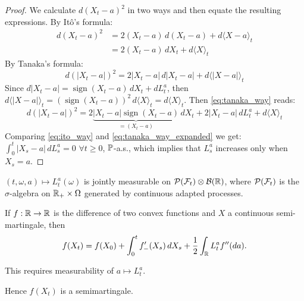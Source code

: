 \begin{proof}
    We calculate $d(X_t - a)^2$ in two ways and then equate the resulting expressions.
    By Itô's formula:
    \begin{align}
        d(X_t - a)^2 &= 2(X_t - a) \, d(X_t - a) + d\langle X - a \rangle_t \nonumber \\
        &= 2(X_t - a) \, dX_t + d\langle X \rangle_t \label{eq:ito_way}
    \end{align}
    By Tanaka's formula:
    \begin{equation}
        d(|X_t - a|)^2 = 2|X_t - a| \, d|X_t - a| + d\langle |X - a| \rangle_t \label{eq:tanaka_way}
    \end{equation}
    Since $d|X_t - a| = \operatorname{sign}(X_t - a) \, dX_t + dL_t^a$, then $d\langle |X - a| \rangle_t = (\operatorname{sign}(X_t - a))^2 \, d\langle X \rangle_t = d\langle X \rangle_t$.
    Then \eqref{eq:tanaka_way} reads:
    \begin{equation}
        d(|X_t - a|)^2 = 2 \underbrace{|X_t - a| \operatorname{sign}(X_t - a)}_{= (X_t - a)} \, dX_t + 2|X_t - a| \, dL_t^a + d\langle X \rangle_t \label{eq:tanaka_way_expanded}
    \end{equation}
    Comparing \eqref{eq:ito_way} and \eqref{eq:tanaka_way_expanded} we get: $\int_0^t |X_s - a| \, dL_s^a = 0$ $\forall t \geq 0$, $\mathbb P$-a.s., which implies that $L_s^a$ increases only when $X_s = a$.
\end{proof}

\begin{fact}
    $(t, \omega, a) \mapsto L_t^a(\omega)$ is jointly measurable on $\mathcal{P}(\mathcal{F}_t) \otimes \mathcal{B}(\mathbb R)$, where $\mathcal{P}(\mathcal{F}_t)$ is the $\sigma$-algebra on $\mathbb R_+ \times \Omega$ generated by continuous adapted processes.
\end{fact}

\begin{theorem}
    If $f: \mathbb R \to \mathbb R$ is the difference of two convex functions and $X$ a continuous semi-martingale, then
    \[ f(X_t) = f(X_0) + \int_0^t f'_-(X_s) \, dX_s + \frac{1}{2} \int_{\mathbb R} L_t^a f''(da). \]
    \begin{remark}
        This requires measurability of $a \mapsto L_t^a$.
    \end{remark}
\end{theorem}

\begin{remark}
    Hence $f(X_t)$ is a semimartingale.
\end{remark}

